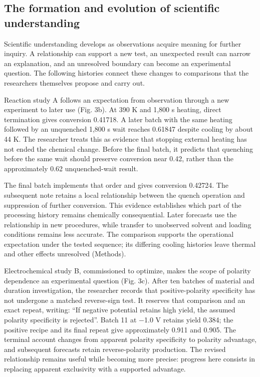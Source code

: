 \documentclass[10pt,a4paper]{article}
\begin{document}
\subsection{The formation and evolution of scientific understanding}\label{the-formation-and-evolution-of-scientific-understanding}

Scientific understanding develops as observations acquire meaning for further inquiry. A relationship can support a new test, an unexpected result can narrow an explanation, and an unresolved boundary can become an experimental question. The following histories connect these changes to comparisons that the researchers themselves propose and carry out.

Reaction study A follows an expectation from observation through a new experiment to later use (Fig. 3b). At 390 K and 1,800 s heating, direct termination gives conversion 0.41718. A later batch with the same heating followed by an unquenched 1,800 s wait reaches 0.61847 despite cooling by about 44 K. The researcher treats this as evidence that stopping external heating has not ended the chemical change. Before the final batch, it predicts that quenching before the same wait should preserve conversion near 0.42, rather than the approximately 0.62 unquenched-wait result.

The final batch implements that order and gives conversion 0.42724. The subsequent note retains a local relationship between the quench operation and suppression of further conversion. This evidence establishes which part of the processing history remains chemically consequential. Later forecasts use the relationship in new procedures, while transfer to unobserved solvent and loading conditions remains less accurate. The comparison supports the operational expectation under the tested sequence; its differing cooling histories leave thermal and other effects unresolved (Methods).

Electrochemical study B, commissioned to optimize, makes the scope of polarity dependence an experimental question (Fig. 3c). After ten batches of material and duration investigation, the researcher records that positive-polarity specificity has not undergone a matched reverse-sign test. It reserves that comparison and an exact repeat, writing: ``If negative potential retains high yield, the assumed polarity specificity is rejected''. Batch 11 at −1.0 V retains yield 0.384; the positive recipe and its final repeat give approximately 0.911 and 0.905. The terminal account changes from apparent polarity specificity to polarity advantage, and subsequent forecasts retain reverse-polarity production. The revised relationship remains useful while becoming more precise: progress here consists in replacing apparent exclusivity with a supported advantage.
\end{document}
